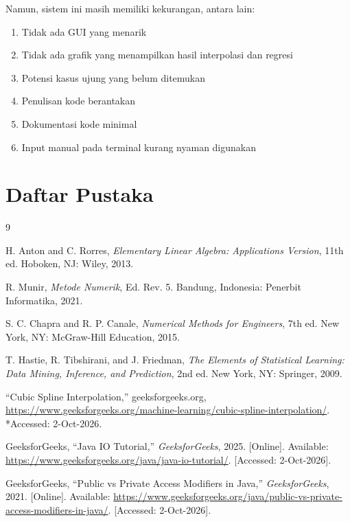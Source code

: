 \documentclass{article}
\begin{document}
\begin{itemize}
\begin{enumerate}
\end{enumerate}
Namun, sistem ini masih memiliki kekurangan, antara lain:
\begin{enumerate}

    \item{Tidak ada GUI yang menarik}
    \item{Tidak ada grafik yang menampilkan hasil interpolasi dan regresi}
    \item{Potensi kasus ujung yang belum ditemukan}
    \item{Penulisan kode berantakan}
    \item{Dokumentasi kode minimal}
    \item{Input manual pada terminal kurang nyaman digunakan}

\end{enumerate}

\section{Daftar Pustaka}
\begin{thebibliography}{9}

H. Anton and C. Rorres, \textit{Elementary Linear Algebra: Applications Version}, 11th ed. Hoboken, NJ: Wiley, 2013.

R. Munir, \textit{Metode Numerik}, Ed. Rev. 5. Bandung, Indonesia: Penerbit Informatika, 2021.

S. C. Chapra and R. P. Canale, \textit{Numerical Methods for Engineers}, 7th ed. New York, NY: McGraw-Hill Education, 2015.

T. Hastie, R. Tibshirani, and J. Friedman, \textit{The Elements of Statistical Learning: Data Mining, Inference, and Prediction}, 2nd ed. New York, NY: Springer, 2009.

``Cubic Spline Interpolation,'' geeksforgeeks.org, \url{https://www.geeksforgeeks.org/machine-learning/cubic-spline-interpolation/}. *Accessed: 2-Oct-2026.


GeeksforGeeks, ``Java IO Tutorial,'' \textit{GeeksforGeeks}, 2025. [Online]. Available: \url{https://www.geeksforgeeks.org/java/java-io-tutorial/}. [Accessed: 2-Oct-2026].


GeeksforGeeks, ``Public vs Private Access Modifiers in Java,'' \textit{GeeksforGeeks}, 2021. [Online]. Available: \url{https://www.geeksforgeeks.org/java/public-vs-private-access-modifiers-in-java/}. [Accessed: 2-Oct-2026].


\end{thebibliography}
\end{itemize}
\end{document}
